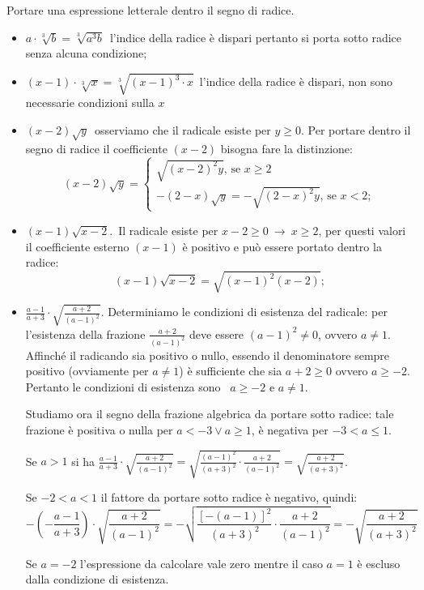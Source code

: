  \begin{esempio}
 Portare una espressione letterale dentro il segno di radice.
 \begin{itemize}
 \item $a\cdot \sqrt[3]b=\sqrt[3]{a^3b}$\, l'indice della radice è dispari
  pertanto si porta sotto radice senza alcuna condizione;
 \item $(x-1)\cdot \sqrt[3]x=\sqrt[3]{(x-1)^3\cdot x}$\, l'indice della
radice
  è dispari, non sono necessarie condizioni sulla $x$
 \item $(x-2)\sqrt y$\, osserviamo che il radicale esiste per $y\ge 0$.
  Per portare dentro il segno di radice il coefficiente $(x-2)$ bisogna
fare
  la distinzione:
 \[
 (x-2)\sqrt y=\left\{\begin{array}{l}\sqrt{(x-2)^2y}\text{, se }x\ge 2\\
 -(2-x)\sqrt y=-\sqrt{(2-x)^2y}\text{, se }x<2;\end{array}\right.
 \]
 \item $(x-1)\sqrt{x-2}$.\, Il radicale esiste per $x-2\ge 0\ \to \ x\ge
2$,
 per questi valori il coefficiente esterno $(x-1)$ è positivo e può essere
 portato dentro la radice: \[(x-1)\sqrt{x-2}=\sqrt{(x-1)^2(x-2)};\]
 \item $\frac{a-1}{a+3}\cdot \sqrt{\frac{a+2}{(a-1)^2}}$. Determiniamo le
 condizioni di esistenza del radicale: per l'esistenza della frazione
 $\frac{a+2}{(a-1)^2}$ deve essere $(a-1)^2\neq 0$, ovvero $a\neq 1$.
 Affinché il radicando sia positivo o nullo, essendo il denominatore
sempre positivo (ovviamente per $a\neq 1$) è sufficiente che sia
$a+2\geqslant 0$ ovvero $a\geqslant -2$.
 Pertanto le condizioni di esistenza sono~ $a\geqslant -2$ e $a\neq 1$.

 Studiamo ora il segno della frazione algebrica da portare sotto radice:
 tale frazione è positiva o nulla per $a<-3\vee a\geqslant 1$, è negativa
 per $-3<a\leqslant 1$.

 Se $a>1$ si ha
 $\frac{a-1}{a+3}\cdot \sqrt{\frac{a+2}{(a-1)^2}}=
  \sqrt{\frac{(a-1)^2}{(a+3)^2}\cdot \frac{a+2}{(a-1)^2}}=
  \sqrt{\frac{a+2}{(a+3)^2}}$.

 Se $-2<a<1$ il fattore da portare sotto radice è negativo, quindi:
 \[-\left(-\frac{a-1}{a+3}\right)\cdot \sqrt{\frac{a+2}{(a-1)^2}}=
   -\sqrt{\frac{[-(a-1)]^2}{(a+3)^2}\cdot \frac{a+2}{(a-1)^2}}=
   -\sqrt{\frac{a+2}{(a+3)^2}}\]

 Se $a=-2$ l'espressione da calcolare vale zero mentre il caso $a=1$ è
escluso  dalla condizione di esistenza.
 \end{itemize}
 \end{esempio}

